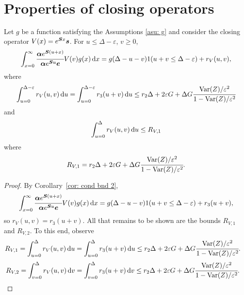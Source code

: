 \section{Properties of closing operators}
\begin{cor}\label{cor: cond bnd 2 V}
	Let \(g\) be a function satisfying the Assumptions \ref{asu: g} and consider the closing operator \(V(x)=e^{\boldsymbol Sx}\boldsymbol s\). For \(u\leq \Delta-\varepsilon \), \(v\geq 0\), 
	\[\int_{x=0}^\infty \cfrac{\boldsymbol \alpha  e^{\boldsymbol{S} (u+x)} }{\boldsymbol \alpha  e^{\boldsymbol{S} u} \boldsymbol e} V(v)g(x)\, \mathrm{d} x = g(\Delta-u-v) 1(u+v\leq\Delta-\varepsilon) + r_V (u,v),\]
	where \[\displaystyle\int_{u=0}^{\Delta-\varepsilon}r_V(u,v)\, \mathrm{d} u = \displaystyle\int_{u=0}^{\Delta-\varepsilon} r_3(u+v)\, \mathrm{d} u \leq r_2\Delta + 2\varepsilon G + \Delta G \cfrac{\mathrm{Var}(Z)/\varepsilon^2}{1-\mathrm{Var}(Z)/\varepsilon^2}\]
	and \[\int_{u=0}^\Delta r_V(u,v) \, \mathrm{d} u\leq R_{V,1}\] where \[R_{V,1}=r_2\Delta + 2\varepsilon G + \Delta G \cfrac{\mathrm{Var}(Z)/\varepsilon^2}{1-\mathrm{Var}(Z)/\varepsilon^2}.\] 
\end{cor}
\begin{proof}
	By Corollary~\ref{cor: cond bnd 2}, 
	\[\int_{x=0}^\infty \cfrac{\boldsymbol \alpha  e^{\boldsymbol{S} (u+x)} }{\boldsymbol \alpha  e^{\boldsymbol{S} u} \boldsymbol e} V(v)g(x)\, \mathrm{d} x = g(\Delta-u-v) 1(u+v\leq\Delta-\varepsilon) + r_3 (u+v),\]
	so \(r_V(u,v)=r_3(u+v)\). All that remains to be shown are the bounds \(R_{V,1}\) and \(R_{V,2}\). To this end, observe 
	\begin{align*}
		R_{V,1}= \displaystyle\int_{u=0}^{\Delta}r_V(u,v)\, \mathrm{d} u 
		 &= \displaystyle\int_{u=0}^{\Delta} r_3(u+v)\, \mathrm{d} u 
		 \leq r_2\Delta + 2\varepsilon G + \Delta G \cfrac{\mathrm{Var}(Z)/\varepsilon^2}{1-\mathrm{Var}(Z)/\varepsilon^2}.
	\end{align*}
	\begin{align*}
		 R_{V,2}= \displaystyle\int_{v=0}^{\Delta}r_V(u,v)\, \mathrm{d} v 
		 &= \displaystyle\int_{v=0}^{\Delta} r_3(u+v)\, \mathrm{d} v 
		 \leq r_2\Delta + 2\varepsilon G + \Delta G \cfrac{\mathrm{Var}(Z)/\varepsilon^2}{1-\mathrm{Var}(Z)/\varepsilon^2}.
	\end{align*}
\end{proof}

